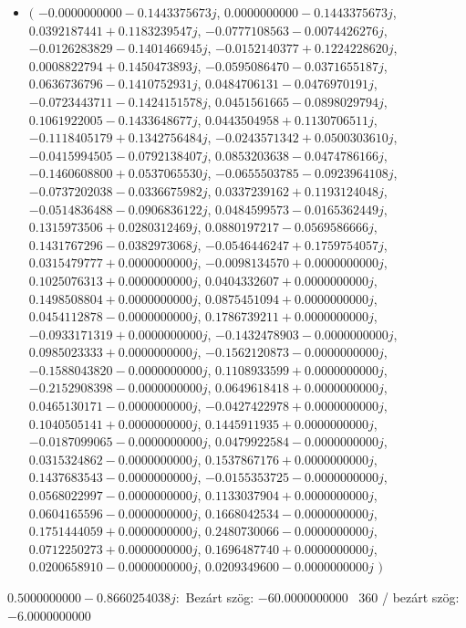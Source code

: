 \documentclass[14pt,a4paper]{article}
\begin{document}
\begin{itemize}
\item
$\big($
$-0.0000000000-0.1443375673j$, $0.0000000000-0.1443375673j$, $0.0392187441+0.1183239547j$, $-0.0777108563-0.0074426276j$, $-0.0126283829-0.1401466945j$, $-0.0152140377+0.1224228620j$, $0.0008822794+0.1450473893j$, $-0.0595086470-0.0371655187j$, $0.0636736796-0.1410752931j$, $0.0484706131-0.0476970191j$, $-0.0723443711-0.1424151578j$, $0.0451561665-0.0898029794j$, $0.1061922005-0.1433648677j$, $0.0443504958+0.1130706511j$, $-0.1118405179+0.1342756484j$, $-0.0243571342+0.0500303610j$, $-0.0415994505-0.0792138407j$, $0.0853203638-0.0474786166j$, $-0.1460608800+0.0537065530j$, $-0.0655503785-0.0923964108j$, $-0.0737202038-0.0336675982j$, $0.0337239162+0.1193124048j$, $-0.0514836488-0.0906836122j$, $0.0484599573-0.0165362449j$, $0.1315973506+0.0280312469j$, $0.0880197217-0.0569586666j$, $0.1431767296-0.0382973068j$, $-0.0546446247+0.1759754057j$, $0.0315479777+0.0000000000j$, $-0.0098134570+0.0000000000j$, $0.1025076313+0.0000000000j$, $0.0404332607+0.0000000000j$, $0.1498508804+0.0000000000j$, $0.0875451094+0.0000000000j$, $0.0454112878-0.0000000000j$, $0.1786739211+0.0000000000j$, $-0.0933171319+0.0000000000j$, $-0.1432478903-0.0000000000j$, $0.0985023333+0.0000000000j$, $-0.1562120873-0.0000000000j$, $-0.1588043820-0.0000000000j$, $0.1108933599+0.0000000000j$, $-0.2152908398-0.0000000000j$, $0.0649618418+0.0000000000j$, $0.0465130171-0.0000000000j$, $-0.0427422978+0.0000000000j$, $0.1040505141+0.0000000000j$, $0.1445911935+0.0000000000j$, $-0.0187099065-0.0000000000j$, $0.0479922584-0.0000000000j$, $0.0315324862-0.0000000000j$, $0.1537867176+0.0000000000j$, $0.1437683543-0.0000000000j$, $-0.0155353725-0.0000000000j$, $0.0568022997-0.0000000000j$, $0.1133037904+0.0000000000j$, $0.0604165596-0.0000000000j$, $0.1668042534-0.0000000000j$, $0.1751444059+0.0000000000j$, $0.2480730066-0.0000000000j$, $0.0712250273+0.0000000000j$, $0.1696487740+0.0000000000j$, $0.0200658910-0.0000000000j$, $0.0209349600-0.0000000000j$
$\big)$
\end{itemize}
$0.5000000000-0.8660254038j$:\
Bezárt szög: $-60.0000000000$ \
360 / bezárt szög: $-6.0000000000$\
\end{document}

